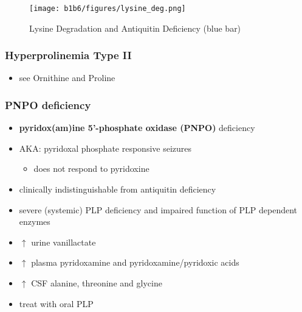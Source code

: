\documentclass[12pt]{scrartcl}
\begin{document}
\begin{figure}[htbp]
\centering
\texttt{[image: b1b6/figures/lysine\_deg.png]}
\caption{\label{fig:orgdc414cf}Lysine Degradation and Antiquitin Deficiency (blue bar)}
\end{figure}

\subsubsection{Hyperprolinemia Type II}
\label{sec:org7155d0d}
\begin{itemize}
\item see Ornithine and Proline
\end{itemize}

\subsubsection{PNPO deficiency}
\label{sec:orgc729c1d}
\begin{itemize}
\item \textbf{pyridox(am)ine 5’-phosphate oxidase (PNPO)} deficiency
\item AKA: pyridoxal phosphate responsive seizures
\begin{itemize}
\item does not respond to pyridoxine
\end{itemize}
\item clinically indistinguishable from antiquitin deficiency
\item severe (systemic) PLP deficiency and impaired function of PLP
dependent enzymes
\item \(\uparrow\) urine vanillactate
\item \(\uparrow\) plasma pyridoxamine and pyridoxamine/pyridoxic acids
\item \(\uparrow\) CSF alanine, threonine and glycine
\item treat with oral PLP
\end{itemize}
\end{document}
